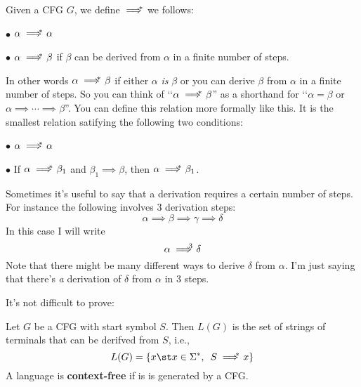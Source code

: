 \begin{defn}
Given a CFG $G$, we define $\implies^{\hspace{-0.3cm}*}$ we follows:
\begin{tightlist}
 \item[$\bullet$] $\alpha \implies^{\hspace{-0.3cm}*}\ \alpha$
 \item[$\bullet$] $\alpha \implies^{\hspace{-0.3cm}*}\ \beta$ if $\beta$ can be derived from 
 $\alpha$ in a finite number of steps.
\end{tightlist}
In other words $\alpha \implies^{\hspace{-0.3cm}*}\ \beta$ if either $\alpha$ \textit{ is} $\beta$
or you can derive $\beta$ from $\alpha$ in a finite number of steps.
So you can think of \lq\lq $\alpha \implies^{\hspace{-0.3cm}*}\ \beta$'' as a shorthand
for \lq\lq $\alpha = \beta$ or $\alpha \implies \cdots \implies \beta$''.
You can define this relation more formally like this.
It is the smallest relation satifying the following two conditions:
\begin{tightlist}
 \item[$\bullet$] $\alpha \implies^{\hspace{-0.3cm}*}\ \alpha$
 \item[$\bullet$] If $\alpha \implies^{\hspace{-0.3cm}*}\ \beta_1$ and 
$\beta_1 \implies \beta$, then 
$\alpha \implies^{\hspace{-0.3cm}*}\ \beta_1$.
\end{tightlist}
\end{defn}
Sometimes it's useful to say that a derivation requires a certain number of
steps.
For instance the following involves 3 derivation steps:
\[
\alpha 
\implies
\beta
\implies
\gamma
\implies
\delta
\]
In this case I will write
\[
\alpha 
\implies^{\hspace{-0.3cm} 3}\  
\delta
\]
Note that there might be many different ways to 
derive $\delta$ from $\alpha$.
I'm just saying that there's \textit{a} derivation of
$\delta$ from $\alpha$ in 3 steps. 

It's not difficult to prove:



\begin{defn}
Let $G$ be a CFG with start symbol $S$.
Then $L(G)$ is the set of strings of terminals that can be derifved from 
$S$, i.e.,
\[
L(G) = \{x \st x \in \Sigma^*, \,\,\, S \implies^{\hspace{-0.3cm}*}\ x \}
\] 
A language is \textbf{context-free} if is is generated by a CFG.
\end{defn}



